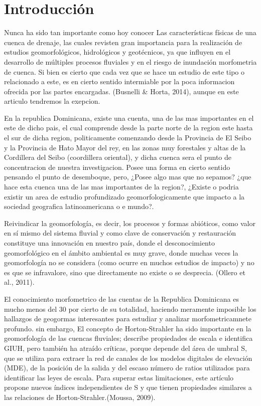 \documentclass[11pt,]{article}
\begin{document}
\vskip 6.5pt


\noindent  \section{Introducción}\label{introducciuxf3n}

Nunca ha sido tan importante como hoy conocer Las características
físicas de una cuenca de drenaje, las cuales revisten gran importancia
para la realización de estudios geomorfológicos, hidrológicos y
geotécnicos, ya que influyen en el desarrollo de múltiples procesos
fluviales y en el riesgo de inundación morfometria de cuenca. Si bien es
cierto que cada vez que se hace un estudio de este tipo o relacionado a
este, es en cierto sentido intermiable por la poca informacion ofrecida
por las partes encargadas. (Busnelli \& Horta, 2014), aunque en este
articulo tendremos la exepcion.

En la republica Dominicana, existe una cuenta, una de las mas
importantes en el este de dicho pais, el cual comprende desde la parte
norte de la region este hasta el sur de dicha region, politicamente
comenzando desde la Provincia de El Seibo y la Provincia de Hato Mayor
del rey, en las zonas muy forestales y altas de la Cordillera del Seibo
(coordillera oriental), y dicha cuenca sera el punto de concentracion de
nuestra investigacion. Posee una forma en cierto sentido pensando el
punto de desemboque, pero, ¿Posee algo mas que no sepamos? ¿que hace
esta cuenca una de las mas importantes de la region?, ¿Existe o podria
existir un area de estudio profundizado geomorfologicamente que impacto
a la sociedad geografica latinoamericana o e mundo?.

Reivindicar la geomorfología, es decir, los procesos y formas abióticos,
como valor en sí mismo del sistema fluvial y como clave de conservación
y restauración constituye una innovación en nuestro país, donde el
desconocimiento geomorfológico en el ámbito ambiental es muy grave,
donde muchas veces la geomorfología no se considera (como ocurre en
muchos estudios de impacto) y no es que se infravalore, sino que
directamente no existe o se desprecia. (Ollero et al., 2011).

El conocimiento morfometrico de las cuentas de la Republica Dominicana
es mucho menos del 30 por cierto de su totalidad, haciendo meramente
imposible los hallazgos de geogormas interesantes para estudiar y
analizar morfometricamnete profundo. sin embargo, El concepto de
Horton-Strahler ha sido importante en la geomorfología de las cuencas
fluviales; describe propiedades de escala e identifica GIUH, pero
también ha atraído críticas, porque depende del área de umbral S, que se
utiliza para extraer la red de canales de los modelos digitales de
elevación (MDE), de la posición de la salida y del escaso número de
ratios utilizados para identificar las leyes de escala. Para superar
estas limitaciones, este artículo propone nuevos índices independientes
de S y que tienen propiedades similares a las relaciones de
Horton-Strahler.(Moussa, 2009).
\end{document}
